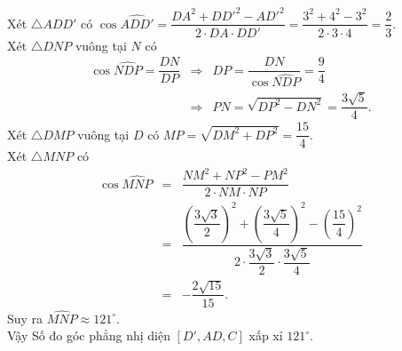 \begin{ex}
{		Xét $\triangle ADD'$ có $\cos\widehat{ADD'} = \dfrac{DA^2 + DD'^2-AD'^2}{2 \cdot DA \cdot DD'} = \dfrac{3^2 + 4^2-3^2}{2 \cdot 3 \cdot 4} = \dfrac{2}{3}$. \\
		Xét $\triangle DNP$ vuông tại $N$ có 
		\begin{eqnarray*}
			\cos\widehat{NDP} = \dfrac{DN}{DP} &\Rightarrow& DP = \dfrac{DN}{\cos\widehat{NDP}} = \dfrac{9}{4} \\
			&\Rightarrow& PN = \sqrt{DP^2-DN^2} = \dfrac{3\sqrt{5}}{4}.
		\end{eqnarray*}
		Xét $\triangle DMP$ vuông tại $D$ có $MP = \sqrt{DM^2 + DP^2} = \dfrac{15}{4}$. \\
		Xét $\triangle MNP$ có 
		\begin{eqnarray*}
			\cos\widehat{MNP} &=& \dfrac{NM^2 + NP^2-PM^2}{2 \cdot NM \cdot NP} \\
			&=& \dfrac{\left(\dfrac{3\sqrt{3}}{2}\right)^2 + \left(\dfrac{3\sqrt{5}}{4}\right)^2-\left(\dfrac{15}{4}\right)^2}{2 \cdot \dfrac{3\sqrt{3}}{2} \cdot \dfrac{3\sqrt{5}}{4}}\\
			&=&-\dfrac{2\sqrt{15}}{15}.
		\end{eqnarray*}
		Suy ra $\widehat{MNP}\approx 121^\circ$. \\
		Vậy Số đo góc phẳng nhị diện $[D', AD, C]$ xấp xỉ $121^\circ$. 
	}
\end{ex}

